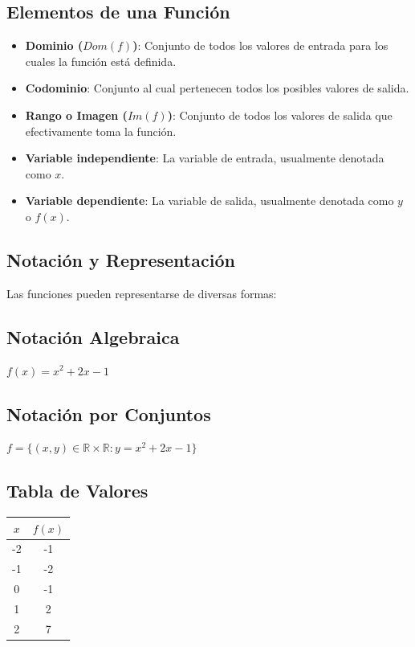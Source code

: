 \documentclass[12pt, a4paper, oneside]{book}
\theoremstyle{definition}
\begin{document}
\subsection{Elementos de una Función}

\begin{itemize}
    \item \textbf{Dominio ($Dom(f)$)}: Conjunto de todos los valores de entrada para los cuales la función está definida.
    \item \textbf{Codominio}: Conjunto al cual pertenecen todos los posibles valores de salida.
    \item \textbf{Rango o Imagen ($Im(f)$)}: Conjunto de todos los valores de salida que efectivamente toma la función.
    \item \textbf{Variable independiente}: La variable de entrada, usualmente denotada como $x$.
    \item \textbf{Variable dependiente}: La variable de salida, usualmente denotada como $y$ o $f(x)$.
\end{itemize}

\subsection{Notación y Representación}

Las funciones pueden representarse de diversas formas:

\subsection{Notación Algebraica}
$f(x) = x^2 + 2x - 1$

\subsection{Notación por Conjuntos}
$f = \{(x,y) \in \mathbb{R} \times \mathbb{R} : y = x^2 + 2x - 1\}$

\subsection{Tabla de Valores}
\begin{center}
\begin{tabular}{|c|c|}
\hline
$x$ & $f(x)$ \\
\hline
-2 & -1 \\
-1 & -2 \\
0 & -1 \\
1 & 2 \\
2 & 7 \\
\hline
\end{tabular}
\end{center}
\end{document}
